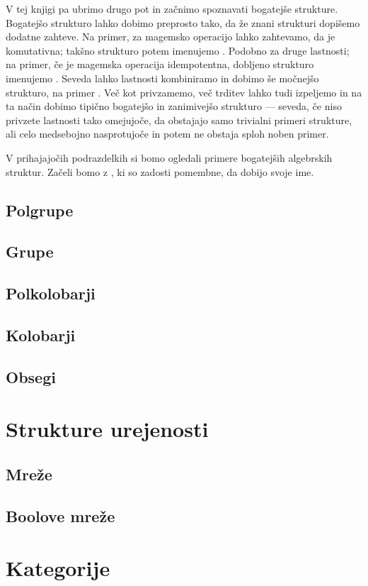 V tej knjigi pa ubrimo drugo pot in začnimo spoznavati bogatejše strukture. Bogatejšo strukturo lahko dobimo preprosto tako, da že znani strukturi dopišemo dodatne zahteve. Na primer, za magemsko operacijo lahko zahtevamo, da je komutativna; takšno strukturo potem imenujemo . Podobno za druge lastnosti; na primer, če je magemska operacija idempotentna, dobljeno strukturo imenujemo . Seveda lahko lastnosti kombiniramo in dobimo še močnejšo strukturo, na primer . Več kot privzamemo, več trditev lahko tudi izpeljemo in na ta način dobimo tipično bogatejšo in zanimivejšo strukturo --- seveda, če niso privzete lastnosti tako omejujoče, da obstajajo samo trivialni primeri strukture, ali celo medsebojno nasprotujoče in potem ne obstaja sploh noben primer.

V prihajajočih podrazdelkih si bomo ogledali primere bogatejših algebrskih struktur. Začeli bomo z , ki so zadosti pomembne, da dobijo svoje ime.

\subsection{Polgrupe}
\subsection{Grupe}
\subsection{Polkolobarji}
\subsection{Kolobarji}
\subsection{Obsegi}
\section{Strukture urejenosti}
\subsection{Mreže}
\subsection{Boolove mreže}
\section{Kategorije}



